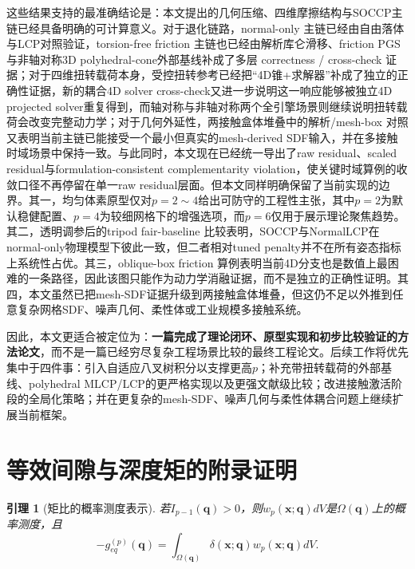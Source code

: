 ﻿\documentclass[12pt, a4paper]{ctexart}
\theoremstyle{plain}
\newtheorem{lemma}{引理}
\theoremstyle{remark}
\begin{document}
这些结果支持的最准确结论是：本文提出的几何压缩、四维摩擦结构与SOCCP主链已经具备明确的可计算意义。对于退化链路，normal-only 主链已经由自由落体与LCP对照验证，torsion-free friction 主链也已经由解析库仑滑移、friction PGS 与非轴对称3D polyhedral-cone外部基线补成了多层 correctness / cross-check 证据；对于四维扭转载荷本身，受控扭转参考已经把``4D锥+求解器''补成了独立的正确性证据，新的耦合4D solver cross-check又进一步说明这一响应能够被独立4D projected solver重复得到，而轴对称与非轴对称两个全引擎场景则继续说明扭转载荷会改变完整动力学；对于几何外延性，两接触盒体堆叠中的解析/mesh-box 对照又表明当前主链已能接受一个最小但真实的mesh-derived SDF输入，并在多接触时域场景中保持一致。与此同时，本文现在已经统一导出了raw residual、scaled residual与formulation-consistent complementarity violation，使关键时域算例的收敛口径不再停留在单一raw residual层面。但本文同样明确保留了当前实现的边界。其一，均匀体素原型仅对$p=2\sim4$给出可防守的工程性主张，其中$p=2$为默认稳健配置、$p=4$为较细网格下的增强选项，而$p=6$仅用于展示理论聚焦趋势。其二，透明调参后的tripod fair-baseline 比较表明，SOCCP与NormalLCP在normal-only物理模型下彼此一致，但二者相对tuned penalty并不在所有姿态指标上系统性占优。其三，oblique-box friction 算例表明当前4D分支也是数值上最困难的一条路径，因此该图只能作为动力学消融证据，而不是独立的正确性证明。其四，本文虽然已把mesh-SDF证据升级到两接触盒体堆叠，但这仍不足以外推到任意复杂网格SDF、噪声几何、柔性体或工业规模多接触系统。

因此，本文更适合被定位为：\textbf{一篇完成了理论闭环、原型实现和初步比较验证的方法论文}，而不是一篇已经穷尽复杂工程场景比较的最终工程论文。后续工作将优先集中于四件事：引入自适应八叉树积分以支撑更高$p$；补充带扭转载荷的外部基线、polyhedral MLCP/LCP的更严格实现以及更强文献级比较；改进接触激活阶段的全局化策略；并在更复杂的mesh-SDF、噪声几何与柔性体耦合问题上继续扩展当前框架。

\appendix

\section{等效间隙与深度矩的附录证明}

\begin{lemma}[矩比的概率测度表示]\label{lem:prob_measure}
若$I_{p-1}(\bm{q}) > 0$，则$w_p(\bm{x};\bm{q}) dV$是$\Omega(\bm{q})$上的概率测度，且
\begin{equation}
    -g_{eq}^{(p)}(\bm{q}) = \int_{\Omega(\bm{q})} \delta(\bm{x};\bm{q}) w_p(\bm{x};\bm{q}) dV .
\end{equation}
\end{lemma}
\end{document}

